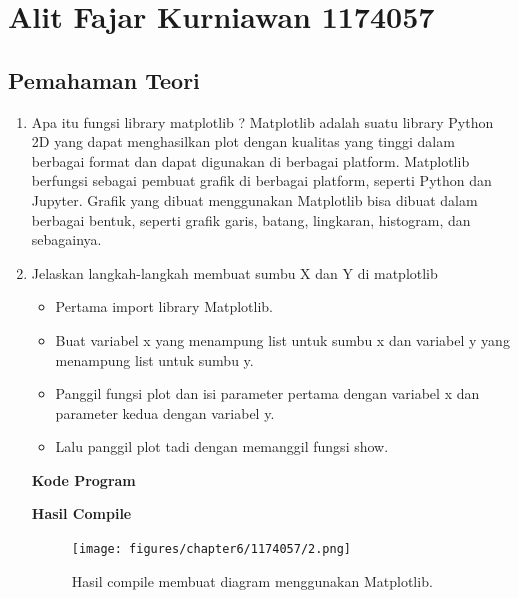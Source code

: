 \section{Alit Fajar Kurniawan 1174057}
\subsection{Pemahaman Teori}
	\begin{enumerate}

		\item Apa itu fungsi library matplotlib ?
			\subitem Matplotlib adalah suatu library Python 2D yang dapat menghasilkan plot dengan kualitas yang tinggi dalam berbagai format dan dapat digunakan di berbagai platform. Matplotlib berfungsi sebagai pembuat grafik di berbagai platform, seperti Python dan Jupyter. Grafik yang dibuat menggunakan Matplotlib bisa dibuat dalam berbagai bentuk, seperti grafik garis, batang, lingkaran, histogram, dan sebagainya.
		
		\item Jelaskan langkah-langkah membuat sumbu X dan Y di matplotlib
			\begin{itemize}
				\item Pertama import library Matplotlib.	
				
				
				\item Buat variabel x yang menampung list untuk sumbu x dan variabel y yang menampung list untuk sumbu y.	
				
				
				\item Panggil fungsi plot dan isi parameter pertama dengan variabel x dan parameter kedua dengan variabel y.
					

				\item Lalu panggil plot tadi dengan memanggil fungsi show.
				
			\end{itemize}

			\hfill \break
			\textbf{Kode Program}
			
				
				
			\hfill \break
			\textbf{Hasil Compile}

			\begin{figure}[H]
				\texttt{[image: figures/chapter6/1174057/2.png]}
				\centering
				\caption{Hasil compile membuat diagram menggunakan Matplotlib.}
			\end{figure}
			

\end{enumerate}
